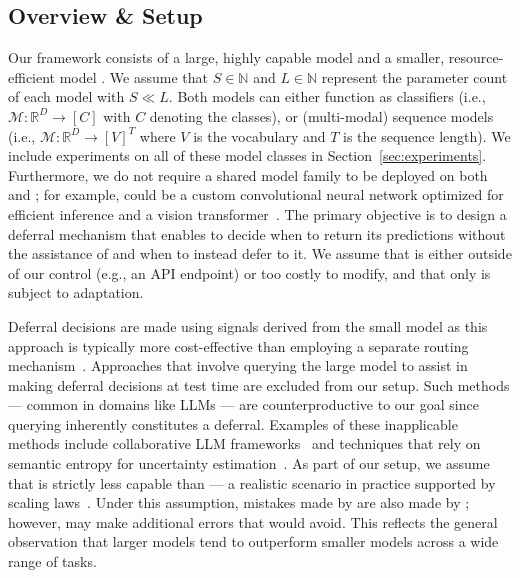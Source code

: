 \subsection{Overview \& Setup}

Our framework consists of a large, highly capable model \textbf{\bigmodel} and a smaller, resource-efficient model \textbf{\smallmodel}. We assume that $S \in \mathbb{N}$ and $L \in \mathbb{N}$ represent the parameter count of each model with $S \ll L$. Both models can either function as classifiers (i.e., $\mathcal{M}: \mathbb{R}^D \rightarrow [C]$ with $C$ denoting the classes), or (multi-modal) sequence models (i.e., $\mathcal{M}: \mathbb{R}^D \rightarrow [V]^{T}$ where $V$ is the vocabulary and $T$ is the sequence length). %
We include experiments on all of these model classes in Section~\ref{sec:experiments}. Furthermore, we do not require a shared model family to be deployed on both \smallmodel and \bigmodel; for example, \smallmodel could be a custom convolutional neural network optimized for efficient inference and \bigmodel a vision transformer~\citep{dosovitskiy2020image}. The primary objective is to design a deferral mechanism that enables \smallmodel to decide when to return its predictions without the assistance of \bigmodel and when to instead defer to it. We assume that \bigmodel is either outside of our control (e.g., an API endpoint) or too costly to modify, and that only \smallmodel is subject to adaptation.

Deferral decisions are made using signals derived from the small model \smallmodel as this approach is typically more cost-effective than employing a separate routing mechanism~\citep{teerapittayanon2016branchynet}. Approaches that involve querying the large model \bigmodel to assist in making deferral decisions at test time are excluded from our setup. Such methods --- common in domains like LLMs --- are counterproductive to our goal since querying \bigmodel inherently constitutes a deferral. Examples of these inapplicable methods include collaborative LLM frameworks~\citep{mielke2022reducing} and techniques that rely on semantic entropy for uncertainty estimation~\citep{kuhn2023semantic}. As part of our setup, we assume that \smallmodel is strictly less capable than \bigmodel --- a realistic scenario in practice supported by scaling laws~\citep{kaplan2020scaling}. Under this assumption, mistakes made by \bigmodel are also made by \smallmodel; however, \smallmodel may make additional errors that \bigmodel would avoid. This reflects the general observation that larger models tend to outperform smaller models across a wide range of tasks.

